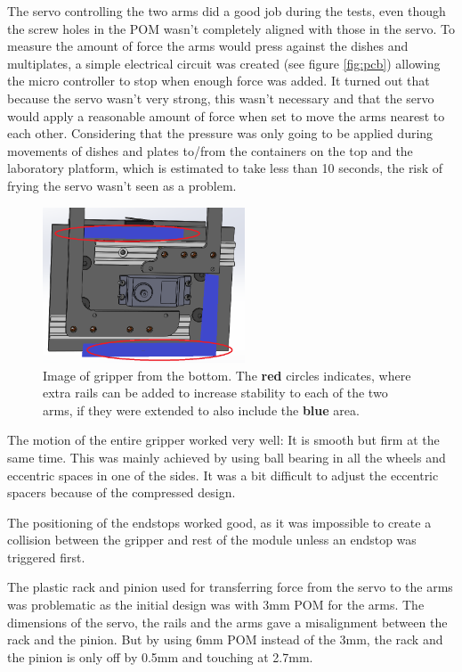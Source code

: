 \documentclass[10pt,a4paper]{article}
\begin{document}
			The servo controlling the two arms did a good job during the tests, even though the screw holes in the POM wasn't completely aligned with those in the servo. To measure the amount of force the arms would press against the dishes and multiplates, a simple electrical circuit was created (see figure \ref{fig:pcb}) allowing the micro controller to stop when enough force was added. It turned out that because the servo wasn't very strong, this wasn't necessary and that the servo would apply a reasonable amount of force when set to move the arms nearest to each other. Considering that the pressure was only going to be applied during movements of dishes and plates to/from the containers on the top and the laboratory platform, which is estimated to take less than 10 seconds, the risk of frying the servo wasn't seen as a problem.\\
							
			\begin{figure}
				\includegraphics[width=6cm]{images/fourRails.png}
				\caption{Image of gripper from the bottom. The {\color{red}\textbf{red}} circles indicates, where extra rails can be added to increase stability to each of the two arms, if they were extended to also include the {\color{blue}\textbf{blue}} area.}
				\label{fig:fourRails}
			\end{figure}
			
			The motion of the entire gripper worked very well: It is smooth but firm at the same time. This was mainly achieved by using ball bearing in all the wheels and eccentric spaces in one of the sides. It was a bit difficult to adjust the eccentric spacers because of the compressed design.
			
			The positioning of the endstops worked good, as it was impossible to create a collision between the gripper and rest of the module unless an endstop was triggered first.
			
			The plastic rack and pinion used for transferring force from the servo to the arms was problematic as the initial design was with 3mm POM for the arms. The dimensions of the servo, the rails and the arms gave a misalignment between the rack and the pinion. But by using 6mm POM instead of the 3mm, the rack and the pinion is only off by 0.5mm and touching at 2.7mm.
			
\end{document}
